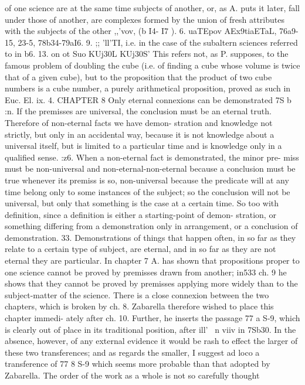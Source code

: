 {{{{{{{{{of one science are at the same time subjects of another, or, as
A. puts it later, fall under those of another, are complexes formed
by the union of fresh attributes with the subjects of the other
,,'vov,
(b I4- I7 ).
6. uaTEpov AEx9tiaETaL, 76a9-15, 23-5, 78b34-79aI6.
9. ;; 'll'TI, i.e. in the case of the subaltern sciences referred to
in b6.
13. on ot Suo KUj30L KUj30S' This refers not, as P. supposes, to
the famous problem of doubling the cube (i.e. of finding a cube
whose volume is twice that of a given cube), but to the proposition
that the product of two cube numbers is a cube number, a purely
arithmetical proposition, proved as such in Euc. El. ix. 4.
CHAPTER 8
Only eternal connexions can be demonstrated
7S b :n. If the premisses are universal, the conclusion must be
an eternal truth. Therefore of non-eternal facts we have demon-
stration and knowledge not strictly, but only in an accidental way,
because it is not knowledge about a universal itself, but is limited
to a particular time and is knowledge only in a qualified sense.
:z6. When a non-eternal fact is demonstrated, the minor pre-
miss must be non-universal and non-eternal-non-eternal because
a conclusion must be true whenever its premiss is so, non-universal
because the predicate will at any time belong only to some
instances of the subject; so the conclusion will not be universal,
but only that something is the case at a certain time. So too with
definition, since a definition is either a starting-point of demon-
stration, or something differing from a demonstration only in
arrangement, or a conclusion of demonstration.
33. Demonstrations of things that happen often, in so far as
they relate to a certain type of subject, are eternal, and in so far
as they are not eternal they are particular.
In chapter 7 A. has shown that propositions proper to one
science cannot be proved by premisses drawn from another; in533
ch. 9 he shows that they cannot be proved by premisses applying
more widely than to the subject-matter of the science. There is
a close connexion between the two chapters, which is broken by
ch. 8. Zabarella therefore wished to place this chapter immedi-
ately after ch. 10. Further, he inserts the passage 77 a S-9, which
is clearly out of place in its traditional position, after ill' ~n
viiv in 7Sb30. In the absence, however, of any external evidence
it would be rash to effect the larger of these two transferences;
and as regards the smaller, I suggest ad loco a transference of
77 8 S-9 which seems more probable than that adopted by Zabarella.
The order of the work as a whole is not so carefully thought
}}}}}}}}}
